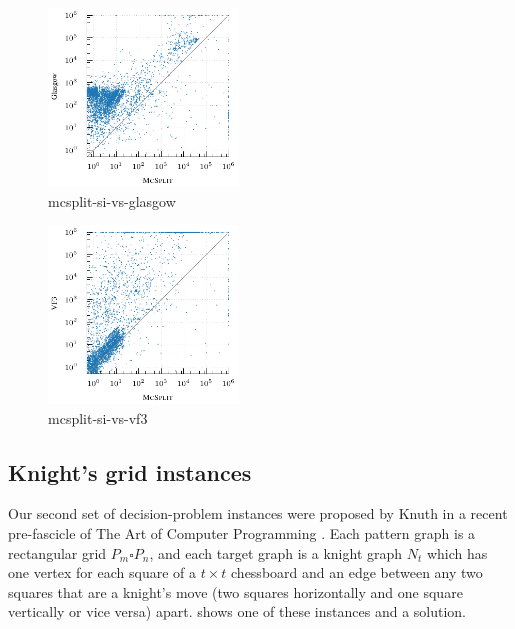 \begin{figure}[h!]
    \centering
    \includegraphics*[width=0.45\textwidth]{14b-mcsplit-induced-si/decision-instances-experiment/experiment/plots/mcsplit-si-vs-glasgow}
    \caption{mcsplit-si-vs-glasgow}
    \label{figure:mcsplit-si-vs-glasgow}
\end{figure}

\begin{figure}[h!]
    \centering
    \includegraphics*[width=0.45\textwidth]{14b-mcsplit-induced-si/decision-instances-experiment/experiment/plots/mcsplit-si-vs-vf3}
    \caption{mcsplit-si-vs-vf3}
    \label{figure:mcsplit-si-vs-vf3}
\end{figure}

\FloatBarrier

\subsection{Knight's grid instances}

Our second set of decision-problem instances were proposed by Knuth in a recent pre-fascicle
of The Art of Computer Programming \cite{knuth2022art}.  Each pattern graph is a rectangular grid
$P_m \square P_n$, and each target graph is a knight graph $N_t$ which has one vertex for each
square of a $t \times t$ chessboard and an edge between any two squares that are a knight's
move (two squares horizontally and one square vertically or vice versa) apart.
 shows one of these instances and a solution.

